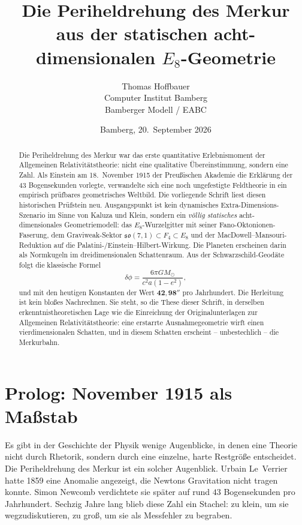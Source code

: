 \documentclass[11pt,a4paper]{article}
\title{\textbf{Die Periheldrehung des Merkur}\\[0.35em]
\large aus der statischen acht-dimensionalen \(E_8\)-Geometrie}
\author{Thomas Hoffbauer\\[0.25em]
\small Computer Institut Bamberg\\
\small Bamberger Modell / EABC}
\date{Bamberg, 20.\ September 2026}
\theoremstyle{definition}
\theoremstyle{remark}
\newcommand{\so}{\mathfrak{so}}
\newcommand{\MS}{M_{\odot}}
\newcommand{\dphi}{\delta\phi}
\begin{document}
\maketitle

\begin{abstract}
\noindent
Die Periheldrehung des Merkur war das erste quantitative Erlebnismoment der Allgemeinen Relativitätstheorie: nicht eine qualitative Übereinstimmung, sondern eine Zahl. Als Einstein am 18.~November 1915 der Preußischen Akademie die Erklärung der $43$ Bogensekunden vorlegte, verwandelte sich eine noch ungefestigte Feldtheorie in ein empirisch prüfbares geometrisches Weltbild. Die vorliegende Schrift liest diesen historischen Prüfstein neu. Ausgangspunkt ist kein dynamisches Extra-Dimensions-Szenario im Sinne von Kaluza und Klein, sondern ein \emph{völlig statisches} acht-dimensionales Geometriemodell: das \(E_8\)-Wurzelgitter mit seiner Fano-Oktonionen-Faserung, dem Graviweak-Sektor \(\so(7,1)\subset F_4\subset E_8\) und der MacDowell--Mansouri-Reduktion auf die Palatini-/Einstein--Hilbert-Wirkung. Die Planeten erscheinen darin als Normkugeln im dreidimensionalen Schattenraum. Aus der Schwarzschild-Geodäte folgt die klassische Formel
\[
\dphi=\frac{6\pi G\MS}{c^2 a(1-e^2)},
\]
und mit den heutigen Konstanten der Wert \(\mathbf{42{,}98''}\) pro Jahrhundert. Die Herleitung ist kein bloßes Nachrechnen. Sie steht, so die These dieser Schrift, in derselben erkenntnistheoretischen Lage wie die Einreichung der Originalunterlagen zur Allgemeinen Relativitätstheorie: eine erstarrte Ausnahmegeometrie wirft einen vierdimensionalen Schatten, und in diesem Schatten erscheint -- unbestechlich -- die Merkurbahn.
\end{abstract}

\newpage
\tableofcontents
\newpage

\section{Prolog: November 1915 als Maßstab}

Es gibt in der Geschichte der Physik wenige Augenblicke, in denen eine Theorie nicht durch Rhetorik, sondern durch eine einzelne, harte Restgröße entscheidet. Die Periheldrehung des Merkur ist ein solcher Augenblick. Urbain Le~Verrier hatte 1859 eine Anomalie angezeigt, die Newtons Gravitation nicht tragen konnte. Simon Newcomb verdichtete sie später auf rund \(43\) Bogensekunden pro Jahrhundert. Sechzig Jahre lang blieb diese Zahl ein Stachel: zu klein, um sie wegzudiskutieren, zu groß, um sie als Messfehler zu begraben.
\end{document}
